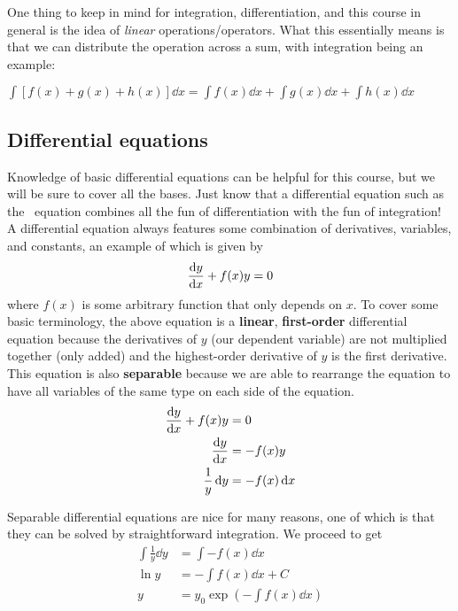 One thing to keep in mind for integration, differentiation, and this course in general is the idea of \emph{linear} operations/operators. What this essentially means is that we can distribute the operation across a sum, with integration being an example:
\begin{tcolorbox}[title=Linear operations---integration example]
	$\displaystyle\int \left[ f(x) + g(x) + h(x) \right]\dd{x} = \displaystyle\int f(x)\dd{x} + \displaystyle\int g(x)\dd{x} + \displaystyle\int h(x)\dd{x}$
\end{tcolorbox}


\subsection{Differential equations}
Knowledge of basic differential equations can be helpful for this course, but we will be sure to cover all the bases. Just know that a differential equation such as the \Sch\ equation combines all the fun of differentiation with the fun of integration! A differential equation always features some combination of derivatives, variables, and constants, an example of which is given by \[ \dv{y}{x} + f(x)y = 0 \] 
where $f(x)$ is some arbitrary function that only depends on $x$. To cover some basic terminology, the above equation is a \textbf{linear}, \textbf{first-order} differential equation because the derivatives of $y$ (our dependent variable) are not multiplied together (only added) and the highest-order derivative of $y$ is the first derivative. This equation is also \textbf{separable} because we are able to rearrange the equation to have all variables of the same type on each side of the equation.
\begin{align*}
\dv{y}{x} + f(x)y &= 0 \\
\dv{y}{x} &= -f(x)y \\
\frac{1}{y}\dd{y} &= -f(x)\dd{x}
\end{align*}

Separable differential equations are nice for many reasons, one of which is that they can be solved by straightforward integration. We proceed to get
\begin{align*}
\int\frac{1}{y}\dd{y} &= \int-f(x)\dd{x} \\
\ln y &= -\int f(x)\dd{x} + C \\
y &= y_0\exp\left(-\int f(x)\dd{x}\right)
\end{align*}

